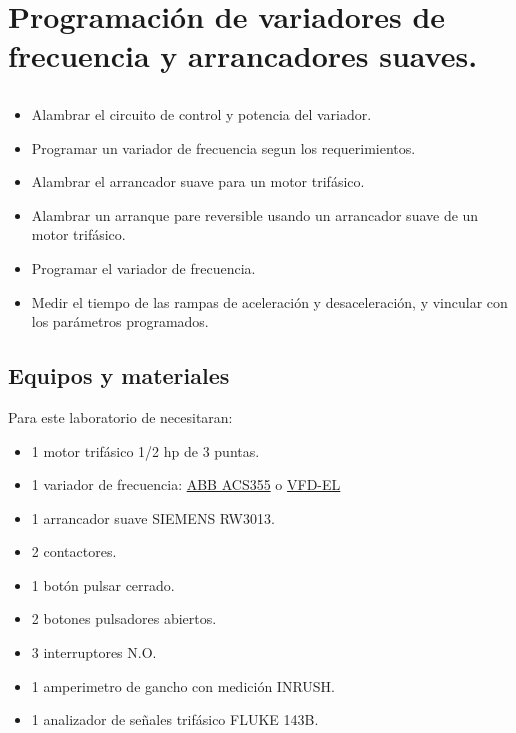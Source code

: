 \chapter{Programación de variadores de frecuencia y arrancadores suaves.}

\section{\obj}
\capacidad
\begin{itemize}
    \item  Alambrar el circuito de control y potencia del variador.
    \item  Programar un variador de frecuencia segun los requerimientos. 
	\item Alambrar el arrancador suave para un motor trifásico.
	\item Alambrar un arranque pare reversible usando un arrancador suave de un motor trifásico.
	\item Programar el variador de frecuencia.
	\item Medir el tiempo de las rampas de aceleración y desaceleración, y vincular con los parámetros programados.
\end{itemize} 

 
\section{Equipos y materiales}
Para este laboratorio de necesitaran:
\begin{itemize}
	\item 1 motor trifásico 1/2 hp de 3 puntas.
	\item 1 variador de frecuencia: \href{https://search.abb.com/library/Download.aspx?DocumentID=3AUA0000066143&LanguageCode=en&DocumentPartId=1&Action=Launch}{ABB ACS355} o \href{https://vfds.com/content/manuals/delta/delta-vfd-el-manual.pdf}{VFD-EL}
	\item 1 arrancador suave SIEMENS RW3013.
	\item 2 contactores.
	\item 1 botón pulsar cerrado.
	\item 2 botones pulsadores abiertos.
	\item 3 interruptores N.O.
	\item 1 amperimetro de gancho con medición INRUSH.
	\item 1 analizador de señales trifásico FLUKE 143B.
\end{itemize}

